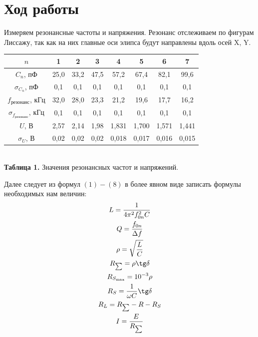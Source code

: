 \documentclass[a4paper, 12pt]{article}%
\begin{document}
\section*{Ход работы}
Измеряем резонансные частоты и напряжения. Резонанс отслеживаем по фигурам Лиссажу, так как на них главные оси элипса будут направлены вдоль осей X, Y. \\
\begin{center}
\begin{tabular}{|c|c|c|c|c|c|c|c|}
\hline
$n$                                                                             & 1    & 2    & 3    & 4    & 5    & 6    & 7    \\ \hline
$C_n$, пФ                                                                       & 25,0 & 33,2 & 47,5 & 57,2 & 67,4 & 82,1 & 99,6 \\ \hline
$\sigma_{C_n}$, пФ                                                              & 0,1  & 0,1  & 0,1  & 0,1  & 0,1  & 0,1  & 0,1  \\ \hline
$f_{\text{резонанс}}$, кГц                                                      & 32,0 & 28,0 & 23,3 & 21,2 & 19,6 & 17,7 & 16,2 \\ \hline
$\sigma_{f_{\text{резонанс}}}$,   кГц & 0,1  & 0,1  & 0,1  & 0,1  & 0,1  & 0,1  & 0,1  \\ \hline
$U$, В                                                                          & 2,57 & 2,14 & 1,98 & 1,831 & 1,700 & 1,571 & 1,441 \\ \hline
$\sigma_U$, В                                                                   & 0,02 & 0,02 & 0,02 & 0,018 & 0,017 & 0,016 & 0,015 \\ \hline
\end{tabular}\\
\textbf{Таблица 1.} Значения резонансных частот и напряжений.
\end{center}
Далее следует из формул $(1)-(8)$ в более явном виде записать формулы необходимых нам величин:
\begin{equation}
\begin{gathered}
L = \dfrac{1}{4\pi^2f_{0n}^2C}\\
Q = \dfrac{f_{0n}}{\Delta f}\\
\rho = \sqrt{\dfrac{L}{C}}\\
R_{\sum} = \rho \tg \delta\\
R_{S_{\max}} = 10^{-3}\rho\\
R_S = \dfrac{1}{\omega C} \tg \delta\\
R_L = R_{\sum} - R - R_S\\
I = \dfrac{E}{R_{\sum}}
\end{gathered}
\end{equation}
\end{document}
